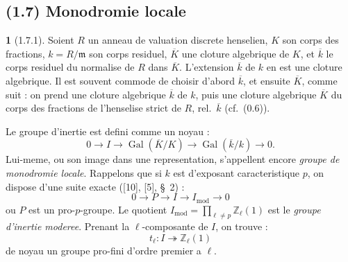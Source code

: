 \documentclass[12pt,a4paper]{article}
\theoremstyle{plain}
\theoremstyle{definition}
\theoremstyle{definition}
\newtheorem{para}{}[section]
\theoremstyle{remark}
\DeclareMathOperator{\Gal}{Gal}
\begin{document}
\newpage

\subsection*{(1.7) Monodromie locale}

\begin{para}[1.7.1]
Soient $R$ un anneau de valuation discrete henselien, $K$ son corps des fractions, $k = R/\mathfrak{m}$ son corps residuel, $\overline{K}$ une cloture algebrique de $K$, et $\overline{k}$ le corps residuel du normalise de $R$ dans $\overline{K}$. L'extension $\overline{k}$ de $k$ en est une cloture algebrique. Il est souvent commode de choisir d'abord $\overline{k}$, et ensuite $\overline{K}$, comme suit : on prend une cloture algebrique $\overline{k}$ de $k$, puis une cloture algebrique $\overline{K}$ du corps des fractions de l'henselise strict de $R$, rel.~$\overline{k}$ (cf.~(0.6)).

Le groupe d'inertie est defini comme un noyau :
\begin{equation}\tag{1.7.1.1}
0 \to I \to \Gal(\overline{K}/K) \to \Gal(\overline{k}/k) \to 0.
\end{equation}
Lui-meme, ou son image dans une representation, s'appellent encore \emph{groupe de monodromie locale}. Rappelons que si $k$ est d'exposant caracteristique $p$, on dispose d'une suite exacte ([10], [5], \S~2) :
\[0 \to P \to I \to I_{\text{mod}} \to 0\]
ou $P$ est un pro-$p$-groupe. Le quotient $I_{\text{mod}} = \prod_{\ell \neq p} \mathbb{Z}_\ell(1)$ est le \emph{groupe d'inertie moderee}. Prenant la $\ell$-composante de $I$, on trouve :
\[t_\ell: I \twoheadrightarrow \mathbb{Z}_\ell(1)\]
de noyau un groupe pro-fini d'ordre premier a $\ell$.
\end{para}
\end{document}
